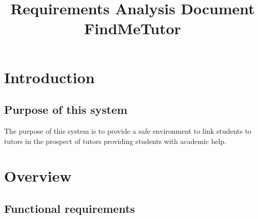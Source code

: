 \documentclass[11pt,a4paper]{article}
\title{Requirements Analysis Document
		\\FindMeTutor}
\begin{document}
	\maketitle
	\newpage
	
	\tableofcontents
	
	\newpage
	\section{Introduction}
		
		\subsection{Purpose of this system}
		The purpose of this system is to provide a safe environment to link students to tutors in the prospect of tutors providing 			students with academic help. 		
		
					
				
		 
		 	
	
	\section{Overview}			
	
		\subsection{Functional requirements}
	
\end{document}
